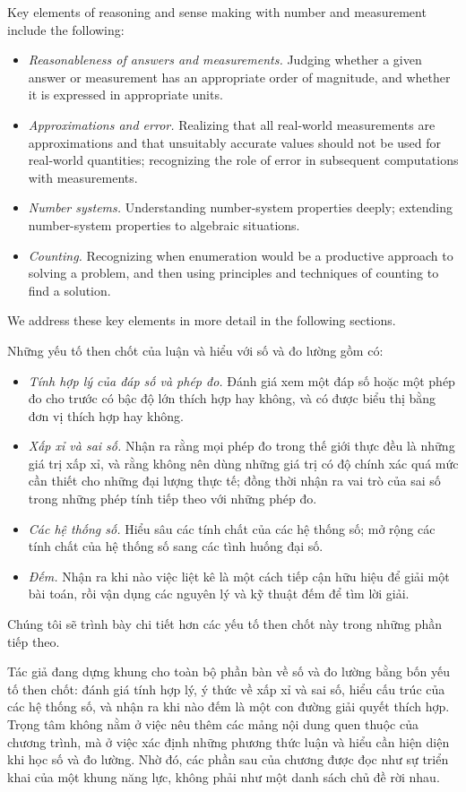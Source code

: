 \documentclass[
  10pt,
  a4paper,
  landscape,
  twoside,
  openany
]{scrbook}
\newcommand{\EN}[1]{#1}
\newcommand{\VI}[1]{#1}
\newcommand{\NOTE}[1]{#1}
\begin{document}
\TriPara
{
\EN{Key elements of reasoning and sense making with number and measurement include the following:

\begin{itemize}
  \item \emph{Reasonableness of answers and measurements.} Judging whether a given answer or measurement has an appropriate order of magnitude, and whether it is expressed in appropriate units.
  \item \emph{Approximations and error.} Realizing that all real-world measurements are approximations and that unsuitably accurate values should not be used for real-world quantities; recognizing the role of error in subsequent computations with measurements.
  \item \emph{Number systems.} Understanding number-system properties deeply; extending number-system properties to algebraic situations.
  \item \emph{Counting.} Recognizing when enumeration would be a productive approach to solving a problem, and then using principles and techniques of counting to find a solution.
\end{itemize}
We address these key elements in more detail in the following sections.}
}
{
\VI{Những yếu tố then chốt của luận và hiểu với số và đo lường gồm có:

\begin{itemize}
  \item \emph{Tính hợp lý của đáp số và phép đo.} Đánh giá xem một đáp số hoặc một phép đo cho trước có bậc độ lớn thích hợp hay không, và có được biểu thị bằng đơn vị thích hợp hay không.
  \item \emph{Xấp xỉ và sai số.} Nhận ra rằng mọi phép đo trong thế giới thực đều là những giá trị xấp xỉ, và rằng không nên dùng những giá trị có độ chính xác quá mức cần thiết cho những đại lượng thực tế; đồng thời nhận ra vai trò của sai số trong những phép tính tiếp theo với những phép đo.
  \item \emph{Các hệ thống số.} Hiểu sâu các tính chất của các hệ thống số; mở rộng các tính chất của hệ thống số sang các tình huống đại số.
  \item \emph{Đếm.} Nhận ra khi nào việc liệt kê là một cách tiếp cận hữu hiệu để giải một bài toán, rồi vận dụng các nguyên lý và kỹ thuật đếm để tìm lời giải.
\end{itemize}
Chúng tôi sẽ trình bày chi tiết hơn các yếu tố then chốt này trong những phần tiếp theo.}
}
{
\NOTE{Tác giả đang dựng khung cho toàn bộ phần bàn về số và đo lường bằng bốn yếu tố then chốt: đánh giá tính hợp lý, ý thức về xấp xỉ và sai số, hiểu cấu trúc của các hệ thống số, và nhận ra khi nào đếm là một con đường giải quyết thích hợp. Trọng tâm không nằm ở việc nêu thêm các mảng nội dung quen thuộc của chương trình, mà ở việc xác định những phương thức luận và hiểu cần hiện diện khi học số và đo lường. Nhờ đó, các phần sau của chương được đọc như sự triển khai của một khung năng lực, không phải như một danh sách chủ đề rời nhau.}
}
\end{document}

